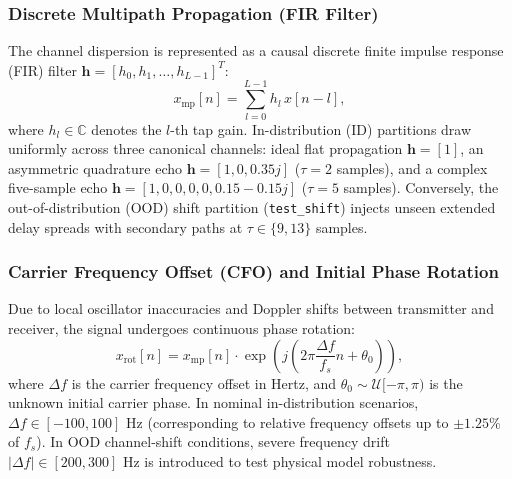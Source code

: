 \subsubsection{Discrete Multipath Propagation (FIR Filter)}
The channel dispersion is represented as a causal discrete finite impulse response (FIR) filter $\mathbf{h} = [h_0, h_1, \dots, h_{L-1}]^T$:
\begin{equation}
x_{\text{mp}}[n] = \sum_{l=0}^{L-1} h_l \, x[n - l],
\label{eq:multipath}
\end{equation}
where $h_l \in \mathbb{C}$ denotes the $l$-th tap gain. In-distribution (ID) partitions draw uniformly across three canonical channels: ideal flat propagation $\mathbf{h} = [1]$, an asymmetric quadrature echo $\mathbf{h} = [1, 0, 0.35j]$ ($\tau = 2$ samples), and a complex five-sample echo $\mathbf{h} = [1, 0, 0, 0, 0, 0.15 - 0.15j]$ ($\tau = 5$ samples). Conversely, the out-of-distribution (OOD) shift partition (\texttt{test\_shift}) injects unseen extended delay spreads with secondary paths at $\tau \in \{9, 13\}$ samples.

\subsubsection{Carrier Frequency Offset (CFO) and Initial Phase Rotation}
Due to local oscillator inaccuracies and Doppler shifts between transmitter and receiver, the signal undergoes continuous phase rotation:
\begin{equation}
x_{\text{rot}}[n] = x_{\text{mp}}[n] \cdot \exp\left(j \left( 2\pi \frac{\Delta f}{f_s} n + \theta_0 \right)\right),
\label{eq:cfo_rotation}
\end{equation}
where $\Delta f$ is the carrier frequency offset in Hertz, and $\theta_0 \sim \mathcal{U}[-\pi, \pi)$ is the unknown initial carrier phase. In nominal in-distribution scenarios, $\Delta f \in [-100, 100]\text{ Hz}$ (corresponding to relative frequency offsets up to $\pm 1.25\%$ of $f_s$). In OOD channel-shift conditions, severe frequency drift $|\Delta f| \in [200, 300]\text{ Hz}$ is introduced to test physical model robustness.

